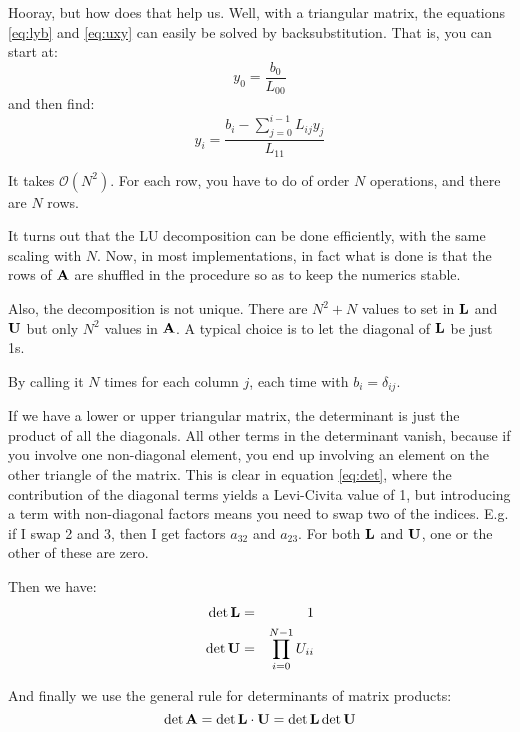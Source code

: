 Hooray, but how does that help us. Well, with a triangular matrix, the
equations \ref{eq:lyb} and \ref{eq:uxy} can easily be solved by
backsubstitution.  That is, you can start at:
\begin{equation}
y_0 = \frac{b_0}{L_{00}}
\end{equation}
and then find:
\begin{equation}
y_i = \frac{b_i - \sum_{j=0}^{i-1} L_{ij} y_j}{L_{11}}
\end{equation}


\begin{answer}
It takes $\mathcal{O}(N^2)$. For each row, you have to do of order $N$
operations, and there are $N$ rows. 
\end{answer}

It turns out that the LU decomposition can be done efficiently, with
the same scaling with $N$. Now, in most implementations, in fact what
is done is that the rows of ${\bf A}$ are shuffled in the procedure so
as to keep the numerics stable.

Also, the decomposition is not unique. There are $N^2 + N$ values to
set in ${\bf L}$ and ${\bf U}$ but only $N^2$ values in ${\bf A}$. A
typical choice is to let the diagonal of ${\bf L}$ be just 1s. 


\begin{answer}
By calling it $N$ times for each column $j$, each time with $b_i =
\delta_{ij}$. 
\end{answer}


\begin{answer}
If we have a lower or upper triangular matrix, the determinant is just
the product of all the diagonals. All other terms in the determinant
vanish, because if you involve one non-diagonal element, you end up
involving an element on the other triangle of the matrix. This is
clear in equation \ref{eq:det}, where the contribution of the diagonal
terms yields a Levi-Civita value of 1, but introducing a term with
non-diagonal factors means you need to swap two of the
indices. E.g. if I swap 2 and 3, then I get factors $a_{32}$ and
$a_{23}$. For both ${\bf L}$ and ${\bf U}$, one or the other of these
are zero.

Then we have:
\begin{eqnarray}
\det {\bf L} &=& 1 \cr
\det {\bf U} &=& \prod_{i=0}^{N-1} U_{ii}
\end{eqnarray}

And finally we use the general rule for determinants of matrix
products:
\begin{equation}
\det {\bf A} =  \det {\bf L}  \cdot {\bf U} = 
\det {\bf L} \det {\bf U}
\end{equation}
\end{answer}

